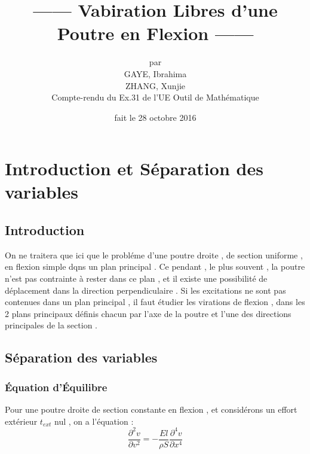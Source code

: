 \documentclass[a4paper,10pt]{report} %
\title{------ Vabiration Libres d'une Poutre en Flexion ------} %
\author{par\\GAYE, Ibrahima\\ ZHANG, Xunjie\\ Compte-rendu du Ex.31 de l'UE Outil de Mathématique } %
\date{fait le 28 octobre 2016} %
\begin{document}
\maketitle %
\tableofcontents %
\listoffigures %













\chapter{Introduction et Séparation des variables}

\section{Introduction}

On ne traitera que ici que le probléme d'une poutre droite , de section uniforme , en flexion simple dqns un plan principal .
Ce pendant , le plus souvent , la poutre n'est pas contrainte à rester dans ce plan , et il existe une possibilité de déplacement dans la direction perpendiculaire . Si les excitations ne sont pas contenues dans un plan principal , il faut étudier les virations de flexion , dans les 2 plans principaux définis chacun par l'axe de la poutre et l'une des directions principales de la section .


\section{Séparation des variables}

\subsection{Équation d'Équilibre}

Pour une poutre droite de section constante en flexion , et considérons un effort extérieur $t_{ext}$ nul , on a l'équation :
\begin{equation}
    \frac{\partial^2v}{\partial{v}^2}=-\frac{El}{\rho S}\frac{\partial^4{v}}{\partial{x}^4}
	\label{equantion1}
\end{equation}
\end{document}
